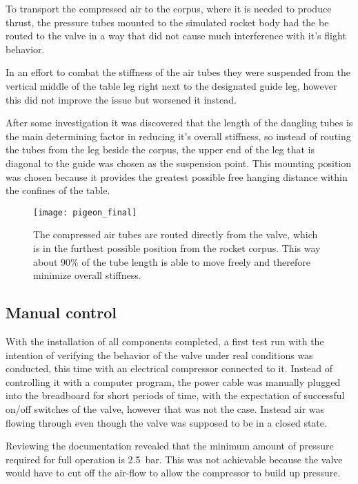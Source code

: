 To transport the compressed air to the corpus, where it is needed to produce thrust, the pressure tubes mounted to the simulated rocket body had the be routed to the valve in a way that did not cause much interference with it's flight behavior. 

In an effort to combat the stiffness of the air tubes they were suspended from the vertical middle of the table leg right next to the designated guide leg, however this did not improve the issue but worsened it instead. 

After some investigation it was discovered that the length of the dangling tubes is the main determining factor in reducing it's overall stiffness, so instead of routing the tubes from the leg beside the corpus, the upper end of the leg that is diagonal to the guide was chosen as the suspension point. This mounting position was chosen because it provides the greatest possible free hanging distance within the confines of the table.

\begin{figure}[h]

\texttt{[image: pigeon\_final]}

\caption{The compressed air tubes are routed directly from the valve, which is in the furthest possible position from the rocket corpus. This way about 90\% of the tube length is able to move freely and therefore minimize overall stiffness.}
\end{figure}


\subsection{Manual control}
With the installation of all components completed, a first test run with the intention of verifying the behavior of the valve under real conditions was conducted, this time with an electrical compressor connected to it. Instead of controlling it with a computer program, the power cable was manually plugged into the breadboard for short periods of time, with the expectation of successful on/off switches of the valve, however that was not the case. Instead air was flowing through even though the valve was supposed to be in a closed state. 

Reviewing the documentation revealed that the minimum amount of pressure required for full operation is \SI{2,5}{\bar}. This was not achievable because the valve would have to cut off the air-flow to allow the compressor to build up pressure.

